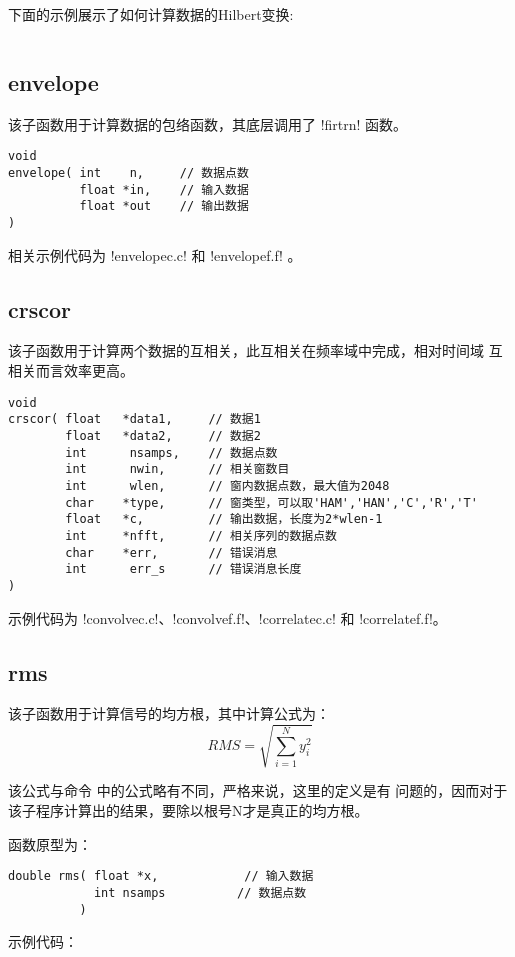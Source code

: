下面的示例展示了如何计算数据的Hilbert变换:
\inputminted{c}{./libs/firtrn.c}

\subsection{envelope}
该子函数用于计算数据的包络函数，其底层调用了 !firtrn! 函数。
\begin{verbatim}
void
envelope( int    n,     // 数据点数
          float *in,    // 输入数据
          float *out    // 输出数据
)
\end{verbatim}

相关示例代码为 !envelopec.c! 和 !envelopef.f! 。

\subsection{crscor}
该子函数用于计算两个数据的互相关，此互相关在频率域中完成，相对时间域
互相关而言效率更高。

\begin{verbatim}
void
crscor( float   *data1,     // 数据1
        float   *data2,     // 数据2
        int      nsamps,    // 数据点数
        int      nwin,      // 相关窗数目
        int      wlen,      // 窗内数据点数，最大值为2048
        char    *type,      // 窗类型，可以取'HAM','HAN','C','R','T'
        float   *c,         // 输出数据，长度为2*wlen-1
        int     *nfft,      // 相关序列的数据点数
        char    *err,       // 错误消息
        int      err_s      // 错误消息长度
)
\end{verbatim}

示例代码为 !convolvec.c!、!convolvef.f!、!correlatec.c!
和 !correlatef.f!。

\subsection{rms}
该子函数用于计算信号的均方根，其中计算公式为：
\[
    RMS = \sqrt{\sum_{i=1}^N y_i^2}
\]

该公式与命令  中的公式略有不同，严格来说，这里的定义是有
问题的，因而对于该子程序计算出的结果，要除以根号N才是真正的均方根。

函数原型为：
\begin{verbatim}
double rms( float *x,            // 输入数据
            int nsamps          // 数据点数
          )
\end{verbatim}

示例代码：
\inputminted{c}{./libs/rms.c}
